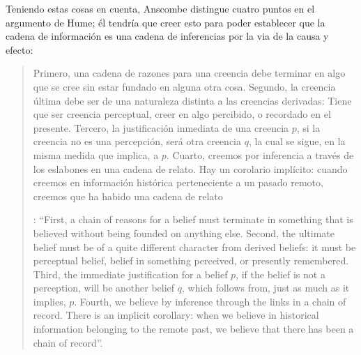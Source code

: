 Teniendo estas cosas en cuenta, Anscombe distingue cuatro puntos en el argumento de Hume; él tendría que creer esto para poder establecer que la cadena de información es una cadena de inferencias por la via de la causa y efecto: \blockquote[{\Cite[88]{anscombe1981parmenides:humeandjulius}}: \enquote{First, a chain of reasons for a belief must terminate in something that is believed without being founded on anything else. Second, the ultimate belief must be of a quite different character from derived beliefs: it must be perceptual belief, belief in something perceived, or presently remembered. Third, the immediate justification for a belief $p$, if the belief is not a perception, will be another belief $q$, which follows from, just as much as it implies, $p$. Fourth, we believe by inference through the links in a chain of record.   There is an implicit corollary: when we believe in historical information belonging to the remote past, we believe that there has been a chain of record}.]{Primero, una cadena de razones para una creencia debe terminar en algo que se cree sin estar fundado en alguna otra cosa. Segundo, la creencia última debe ser de una naturaleza distinta a las creencias derivadas: Tiene que ser creencia perceptual, creer en algo percibido, o recordado en el presente. Tercero, la justificación inmediata de una creencia $p$, si la creencia no es una percepción, será otra creencia $q$, la cual se sigue, en la misma medida que implica, a $p$. Cuarto, creemos por inferencia a través de los eslabones en una cadena de relato. Hay un corolario implícito: cuando creemos en información histórica perteneciente a un pasado remoto, creemos que ha habido una cadena de relato}.

